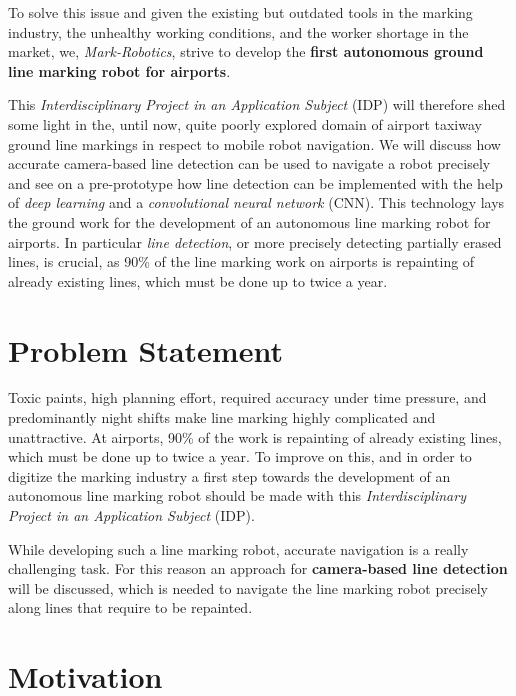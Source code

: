 To solve this issue and given the existing but outdated tools in the marking industry, the unhealthy working conditions, and the worker shortage in the market, we, \emph{Mark-Robotics}, strive to develop the \textbf{first autonomous ground line marking robot for airports}.

This \emph{Interdisciplinary Project in an Application Subject} (IDP) will therefore shed some light in the, until now, quite poorly explored domain of airport taxiway ground line markings in respect to mobile robot navigation. We will discuss how accurate camera-based line detection can be used to navigate a robot precisely and see on a pre-prototype how line detection can be implemented with the help of  \emph{deep learning} and a \emph{convolutional neural network} (CNN). This technology lays the ground work for the development of an autonomous line marking robot for airports. In particular \emph{line detection}, or more precisely detecting partially erased lines, is crucial, as 90\% of the line marking work on airports is repainting of already existing lines, which must be done up to twice a year. 

\section{Problem Statement}
\label{sec:introduction-problem-statement}

Toxic paints, high planning effort, required accuracy under time pressure, and predominantly night shifts make line marking highly complicated and unattractive. At airports, 90\% of the work is repainting of already existing lines, which must be done up to twice a year. To improve on this, and in order to digitize the marking industry a first step towards the development of an autonomous line marking robot should be made with this \emph{Interdisciplinary Project in an Application Subject} (IDP).

While developing such a line marking robot, accurate navigation is a really challenging task. For this reason an approach for \textbf{camera-based line detection} will be discussed, which is needed to navigate the line marking robot precisely along lines that require to be repainted.

\newpage

\section{Motivation}
\label{sec:introduction-motivation}

